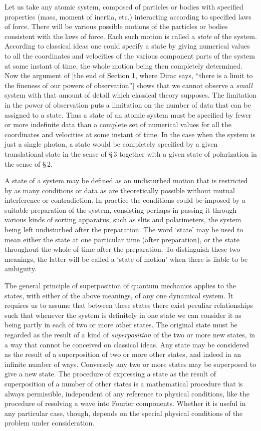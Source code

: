Let us take any atomic system, composed of particles or bodies with specified properties (mass, moment of inertia, etc.) interacting according to specified laws of force.  There will be various possible motions of the particles or bodies consistent with the laws of force.  Each such motion is called a \emph{state} of the system.  According to classical ideas one could specify a state by giving numerical values to all the coordinates and velocities of the various component parts of the system at some instant of time, the whole motion being then completely determined.  Now the argument of [the end of Section 1, where Dirac says, ``there is a limit to the fineness of our powers of observation''] shows that we cannot observe a \emph{small} system with that amount of detail which classical theory supposes.  The limitation in the power of observation puts a limitation on the number of data that can be assigned to a state.  Thus a state of an atomic system must be specified by fewer or more indefinite data than a complete set of numerical values for all the coordinates and velocities at some instant of time.  In the case when the system is just a single photon, a state would be completely specified by a given translational state in the sense of \S\,3 together with a given state of polarization in the sense of \S\,2.

A state of a system may be defined as an undisturbed motion that is restricted by as many conditions or data as are theoretically possible without mutual interference or contradiction.  In practice the conditions could be imposed by a suitable preparation of the system, consisting perhaps in passing it through various kinds of sorting apparatus, such as slits and polarimeters, the system being left undisturbed after the preparation.  The word `state' may be used to mean either the state at one particular time (after preparation), or the state throughout the whole of time after the preparation.  To distinguish these two meanings, the latter will be called a `state of motion' when there is liable to be ambiguity.

The general principle of superposition of quantum mechanics applies to the states, with either of the above meanings, of any one dynamical system.  It requires us to assume that between these states there exist peculiar relationships such that whenever the system is definitely in one state we can consider it as being partly in each of two or more other states.  The original state must be regarded as the result of a kind of \emph{superposition} of the two or more new states, in a way that cannot be conceived on classical ideas.  Any state may be considered as the result of a superposition of two or more other states, and indeed in an infinite number of ways.  Conversely any two or more states may be superposed to give a new state.  The procedure of expressing a state as the result of superposition of a number of other states is a mathematical procedure that is always permissible, independent of any reference to physical conditions, like the procedure of resolving a wave into Fourier components.  Whether it is useful in any particular case, though, depends on the special physical conditions of the problem under consideration.

